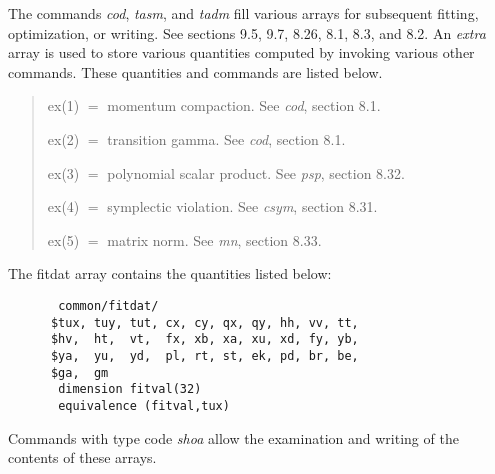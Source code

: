 The commands {\em cod}, {\em tasm}, and {\em tadm} fill various arrays for subsequent fitting, optimization, or writing.  See sections 9.5, 9.7, 8.26, 8.1, 8.3, and 8.2.  An {\em extra} array is used to store various quantities computed by invoking various other commands.  These quantities and commands are listed below.
\begin{quotation}
\item ex(1) $=$ momentum compaction.  See {\em cod}, section 8.1.
\item ex(2) $=$ transition gamma.  See {\em cod}, section 8.1.
\item ex(3) $=$ polynomial scalar product.  See {\em psp}, section 8.32.
\item ex(4) $=$ symplectic violation.  See {\em csym}, section 8.31.
\item ex(5) $=$ matrix norm.  See {\em mn}, section 8.33.
\end{quotation}
The fitdat array contains the quantities listed below:

\begin{verbatim}
       common/fitdat/
      $tux, tuy, tut, cx, cy, qx, qy, hh, vv, tt,
      $hv,  ht,  vt,  fx, xb, xa, xu, xd, fy, yb,
      $ya,  yu,  yd,  pl, rt, st, ek, pd, br, be,
      $ga,  gm
       dimension fitval(32)
       equivalence (fitval,tux)
\end{verbatim}

\noindent Commands with type code {\em shoa} allow the examination and writing of the contents of these arrays.






